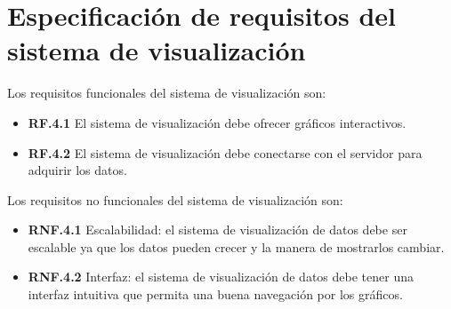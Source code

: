 \section{Especificación de requisitos del sistema de visualización}

Los requisitos funcionales del sistema de visualización son:

\begin{itemize}
	\item \textbf{RF.4.1} El sistema de visualización debe ofrecer gráficos interactivos.	
	\item \textbf{RF.4.2} El sistema de visualización debe conectarse con el servidor para adquirir los datos.
\end{itemize}

Los requisitos no funcionales del sistema de visualización son:

\begin{itemize}
		\item \textbf{RNF.4.1} Escalabilidad: el sistema de visualización de datos debe ser escalable ya que los datos pueden crecer y la manera de mostrarlos cambiar.
		\item \textbf{RNF.4.2} Interfaz: el sistema de visualización de datos debe tener una interfaz intuitiva que permita una buena navegación por los gráficos.
\end{itemize}
